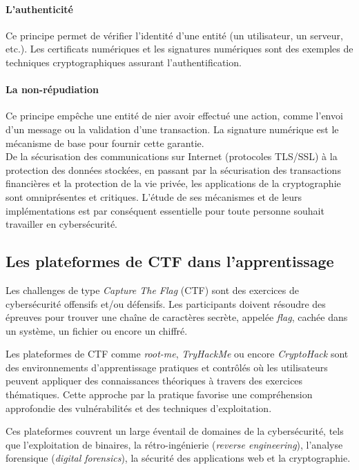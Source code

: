 \paragraph{L'authenticité}
Ce principe permet de vérifier l'identité d'une entité (un utilisateur, un
serveur, etc.). Les certificats numériques et les signatures numériques sont
des exemples de techniques cryptographiques assurant l'authentification.

\paragraph{La non-répudiation}
Ce principe empêche une entité de nier avoir effectué une action, comme
l'envoi d'un message ou la validation d'une transaction. La signature
numérique est le mécanisme de base pour fournir cette garantie.\\

De la sécurisation des communications sur Internet (protocoles TLS/SSL) à
la protection des données stockées, en passant par la sécurisation des
transactions financières et la protection de la vie privée, les
applications de la cryptographie sont omniprésentes et critiques. L'étude
de ses mécanismes et de leurs implémentations est par conséquent
essentielle pour toute personne souhait travailler en cybersécurité.

\subsection{Les plateformes de CTF dans l'apprentissage}
Les challenges de type \textit{Capture The Flag} (CTF) sont des exercices de
cybersécurité offensifs et/ou défensifs. Les participants doivent résoudre
des épreuves pour trouver une chaîne de caractères secrète, appelée
\textit{flag}, cachée dans un système, un fichier ou encore un chiffré.

Les plateformes de CTF comme \textit{root-me}, \textit{TryHackMe} ou encore
\textit{CryptoHack} sont des environnements d'apprentissage pratiques et
contrôlés où les utilisateurs peuvent appliquer des connaissances théoriques
à travers des exercices thématiques. Cette approche par la pratique favorise
une compréhension approfondie des vulnérabilités et des techniques
d'exploitation.

Ces plateformes couvrent un large éventail de domaines de la cybersécurité,
tels que l'exploitation de binaires, la rétro-ingénierie (\textit{reverse
engineering}), l'analyse forensique (\textit{digital forensics}), la
sécurité des applications web et la cryptographie.

